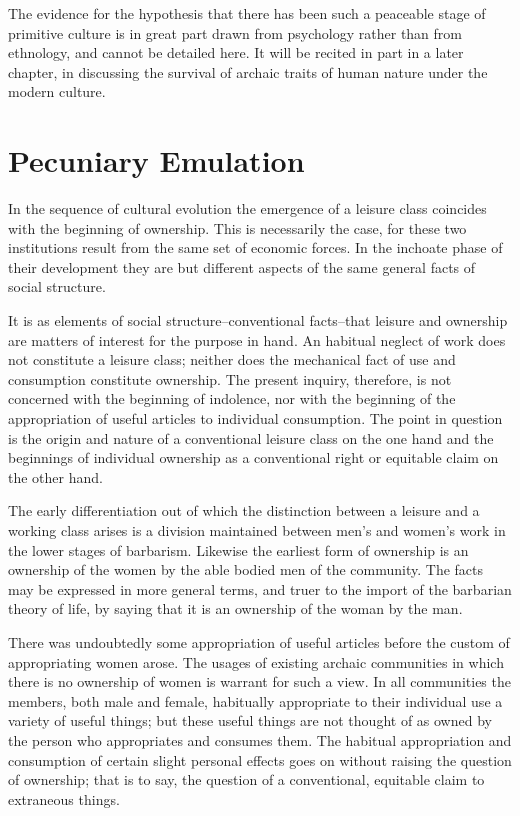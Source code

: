 \documentclass[12pt]{report}
\begin{document}
The evidence for the hypothesis that there has been such a peaceable
stage of primitive culture is in great part drawn from psychology rather
than from ethnology, and cannot be detailed here. It will be recited in
part in a later chapter, in discussing the survival of archaic traits of
human nature under the modern culture.




\chapter{Pecuniary Emulation}
In the sequence of cultural evolution the emergence of a leisure class
coincides with the beginning of ownership. This is necessarily the case,
for these two institutions result from the same set of economic forces.
In the inchoate phase of their development they are but different
aspects of the same general facts of social structure.

It is as elements of social structure--conventional facts--that leisure
and ownership are matters of interest for the purpose in hand. An
habitual neglect of work does not constitute a leisure class; neither
does the mechanical fact of use and consumption constitute ownership.
The present inquiry, therefore, is not concerned with the beginning
of indolence, nor with the beginning of the appropriation of useful
articles to individual consumption. The point in question is the origin
and nature of a conventional leisure class on the one hand and the
beginnings of individual ownership as a conventional right or equitable
claim on the other hand.

The early differentiation out of which the distinction between a leisure
and a working class arises is a division maintained between men's and
women's work in the lower stages of barbarism. Likewise the earliest
form of ownership is an ownership of the women by the able bodied men
of the community. The facts may be expressed in more general terms, and
truer to the import of the barbarian theory of life, by saying that it
is an ownership of the woman by the man.

There was undoubtedly some appropriation of useful articles before the
custom of appropriating women arose. The usages of existing archaic
communities in which there is no ownership of women is warrant for such
a view. In all communities the members, both male and female, habitually
appropriate to their individual use a variety of useful things; but
these useful things are not thought of as owned by the person who
appropriates and consumes them. The habitual appropriation and
consumption of certain slight personal effects goes on without
raising the question of ownership; that is to say, the question of a
conventional, equitable claim to extraneous things.
\end{document}

